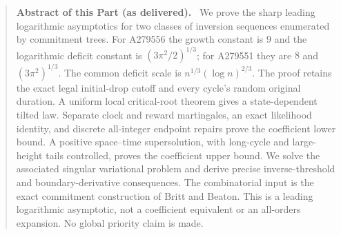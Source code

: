 \documentclass[11pt,letterpaper]{article}
\theoremstyle{remark}\newtheorem{remark}[theorem]{Remark}
\numberwithin{equation}{section}
\newenvironment{partabstract}{\begin{quote}\small\noindent\textbf{Abstract of this Part (as delivered).}\ }{\end{quote}}
\begin{document}
\begin{partabstract}
We prove the sharp leading logarithmic asymptotics for two classes of
inversion sequences enumerated by commitment trees. For A279556 the
growth constant is $9$ and the logarithmic deficit constant is
$(3\pi^2/2)^{1/3}$; for A279551 they are $8$ and $(3\pi^2)^{1/3}$.
The common deficit scale is $n^{1/3}(\log n)^{2/3}$.
The proof retains the exact legal initial-drop cutoff and every cycle's
random original duration. A uniform local critical-root theorem gives
a state-dependent tilted law. Separate clock and reward martingales,
an exact likelihood identity, and discrete all-integer endpoint repairs
prove the coefficient lower bound. A positive space--time
supersolution, with long-cycle and large-height tails controlled,
proves the coefficient upper bound. We solve the associated singular
variational problem and derive precise inverse-threshold and
boundary-derivative consequences. The combinatorial input is the exact
commitment construction of Britt and Beaton. This is a leading
logarithmic asymptotic, not a coefficient equivalent or an all-orders
expansion. No global priority claim is made.
\end{partabstract}
\end{document}
